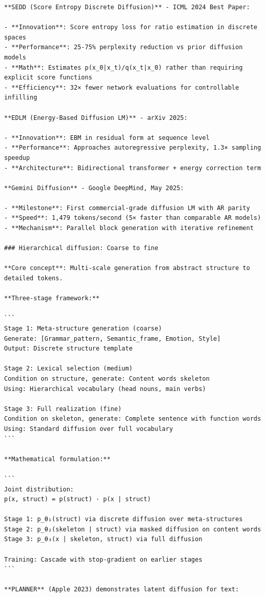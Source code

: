 \documentclass[11pt]{article}
\begin{document}
\begin{verbatim}
**SEDD (Score Entropy Discrete Diffusion)** - ICML 2024 Best Paper:

- **Innovation**: Score entropy loss for ratio estimation in discrete spaces
- **Performance**: 25-75% perplexity reduction vs prior diffusion models
- **Math**: Estimates p(x_0|x_t)/q(x_t|x_0) rather than requiring explicit score functions
- **Efficiency**: 32× fewer network evaluations for controllable infilling

**EDLM (Energy-Based Diffusion LM)** - arXiv 2025:

- **Innovation**: EBM in residual form at sequence level
- **Performance**: Approaches autoregressive perplexity, 1.3× sampling speedup
- **Architecture**: Bidirectional transformer + energy correction term

**Gemini Diffusion** - Google DeepMind, May 2025:

- **Milestone**: First commercial-grade diffusion LM with AR parity
- **Speed**: 1,479 tokens/second (5× faster than comparable AR models)
- **Mechanism**: Parallel block generation with iterative refinement

### Hierarchical diffusion: Coarse to fine

**Core concept**: Multi-scale generation from abstract structure to detailed tokens.

**Three-stage framework:**

```
Stage 1: Meta-structure generation (coarse)
Generate: [Grammar_pattern, Semantic_frame, Emotion, Style]
Output: Discrete structure template

Stage 2: Lexical selection (medium)  
Condition on structure, generate: Content words skeleton
Using: Hierarchical vocabulary (head nouns, main verbs)

Stage 3: Full realization (fine)
Condition on skeleton, generate: Complete sentence with function words
Using: Standard diffusion over full vocabulary
```

**Mathematical formulation:**

```
Joint distribution:
p(x, struct) = p(struct) · p(x | struct)

Stage 1: p_θ₁(struct) via discrete diffusion over meta-structures
Stage 2: p_θ₂(skeleton | struct) via masked diffusion on content words
Stage 3: p_θ₃(x | skeleton, struct) via full diffusion

Training: Cascade with stop-gradient on earlier stages
```

**PLANNER** (Apple 2023) demonstrates latent diffusion for text:


\end{verbatim}
\end{document}
